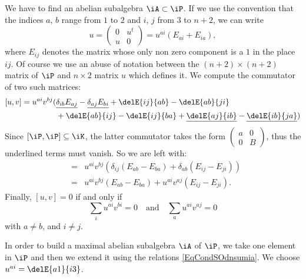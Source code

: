 We have to find an abelian subalgebra $\iA\subset\iP$. If we use the convention that the indices $a$, $b$ range from $1$ to $2$ and $i$, $j$ from $3$ to $n+2$, we can write
\begin{equation}
	u=\begin{pmatrix}
		0 & u^t \\
		u & 0
	\end{pmatrix}=u^{ai}(E_{ai}+E_{ia}),
\end{equation}
where $E_{ij}$ denotes the matrix whose only non zero component is a $1$ in the place $ij$. Of course we use an abuse of notation between the $(n+2)\times(n+2)$ matrix of $\iP$ and $n\times 2$ matrix $u$ which defines it. We compute the commutator of two such matrices:
\begin{equation}
	\begin{split}
		[u,v]=u^{ai}v^{bj}(&\underline{\delta_{ib}E_{aj}}-\underline{\delta_{aj}E_{bi}}+\delE{ij}{ab}-\delE{ab}{ji}\\
		&+ \delE{ab}{ij}-\delE{ij}{ba}+\underline{\delE{aj}{ib}}-\underline{\delE{ib}{ja}})
	\end{split}
\end{equation}
Since $[\iP,\iP]\subseteq\iK$, the latter commutator takes the form $\begin{pmatrix}
		a & 0 \\
		0 & B
	\end{pmatrix}$, thus the underlined terms must vanish. So we are left with:
\begin{eqnarray}
	[u,v]&=&u^{ai}v^{bj}(\delta_{ij}(E_{ab}-E_{ba})+\delta_{ab}(E_{ij}-E_{ji}))\\
	&=&u^{ai}v^{bj} (E_{ab}-E_{ba})+u^{ai}v^{aj} (E_{ij}-E_{ji}).
\end{eqnarray}
Finally, $[u,v]=0$ if and only if
\begin{equation} \label{EqCondSOdnsumia}
	\sum_iu^{ai}v^{bi}=0\quad\text{and}\quad \sum_au^{ai}v^{aj}=0
\end{equation}
with $a\neq b$, and $i\neq j$.

In order to build a maximal abelian subalgebra $\iA$ of $\iP$, we take one element in $\iP$ and then we extend it using the relations \eqref{EqCondSOdnsumia}. We choose $u^{ai}=\delE{a1}{i3}$.

